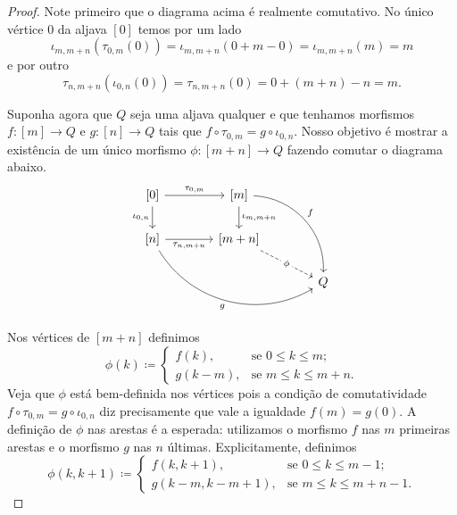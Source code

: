 \begin{proof}
    Note primeiro que o diagrama acima é realmente comutativo.
    No único vértice $0$ da aljava $[0]$ temos por um lado
    \begin{displaymath}
        \iota_{m,m+n}(\tau_{0,m}(0))
        = \iota_{m,m+n}(0+m-0)
        = \iota_{m,m+n}(m)
        = m
    \end{displaymath}
    e por outro
    \begin{displaymath}
        \tau_{n,m+n}(\iota_{0,n}(0))
        = \tau_{n,m+n}(0)
        = 0 + (m+n) - n
        = m.
    \end{displaymath}
    
    Suponha agora que $Q$ seja uma aljava qualquer e que tenhamos morfismos $f: [m] \to Q$ e $g: [n] \to Q$ tais que $f \circ \tau_{0,m} = g \circ \iota_{0,n}$.
    Nosso objetivo é mostrar a existência de um único morfismo $\phi: [m+n] \to Q$ fazendo comutar o diagrama abaixo.
    \begin{displaymath}
        \begin{tikzcd}[column sep=1.35cm]
            {[0]}
            \arrow[r,"{\tau_{0,m}}"]
            \arrow[d, "{\iota_{0,n}}" swap]
            & {[m]}
            \arrow[d, "{\iota_{m,m+n}}"]
            \arrow[rdd, bend left=45, "f"]
            \\ {[n]}
            \arrow[r, "{\tau_{n,m+n}}" swap]
            \arrow[rrd, bend right=45, "g" swap]
            & {[m+n]}
            \arrow[rd, dashed, "\phi" description]
            \\ & & Q
        \end{tikzcd}
    \end{displaymath}
    Nos vértices de $[m+n]$ definimos
    \begin{displaymath}
        \phi(k) \coloneqq
        \begin{cases}
            f(k), & \text{se } 0 \leq k \leq m; \\
            g(k-m), & \text{se } m \leq k \leq m+n.
        \end{cases}
    \end{displaymath}
    Veja que $\phi$ está bem-definida nos vértices pois a condição de comutatividade $f \circ \tau_{0,m} = g \circ \iota_{0,n}$ diz precisamente que vale a igualdade $f(m) = g(0)$.
    A definição de $\phi$ nas arestas é a esperada: utilizamos o morfismo $f$ nas $m$ primeiras arestas e o morfismo $g$ nas $n$ últimas.
    Explicitamente, definimos
    \begin{displaymath}
        \phi(k,k+1) \coloneqq
        \begin{cases}
            f(k,k+1), & \text{se } 0 \leq k \leq m-1; \\
            g(k-m,k-m+1), & \text{se } m \leq k \leq m+n-1.
        \end{cases}
    \end{displaymath}
    

\end{proof}
